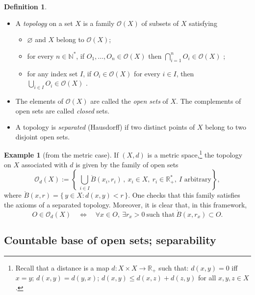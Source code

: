 \documentclass[11pt]{article}
\theoremstyle{definition}
\newtheorem{definition}{Definition}[section]
\newtheorem{example}{Example}[section]
\begin{document}
\begin{definition}
\begin{itemize}[leftmargin=1.5em]
\item[(a)] A \emph{topology} on a set $X$ is a family $\mathcal{O}(X)$ of subsets of $X$ satisfying
\begin{itemize}[leftmargin=1.2em]
\item[(i)] $\varnothing$ and $X$ belong to $\mathcal{O}(X)$;
\item[(ii)] for every $n\in\mathbb{N}^{\!*}$, if $O_1,\dots,O_n\in\mathcal{O}(X)$ then $\displaystyle \bigcap_{i=1}^n O_i\in\mathcal{O}(X)$ ;
\item[(iii)] for any index set $I$, if $O_i\in\mathcal{O}(X)$ for every $i\in I$, then $\displaystyle \bigcup_{i\in I} O_i\in\mathcal{O}(X)$ .
\end{itemize}
\item[(b)] The elements of $\mathcal{O}(X)$ are called the \emph{open sets} of $X$.
The complements of open sets are called \emph{closed} sets.
\item[(c)] A topology is \emph{separated} (Hausdorff) if two distinct points of $X$ belong to two disjoint open sets.
\end{itemize}
\end{definition}

\begin{example}[from the metric case]
If $(X,d)$ is a metric space,\footnote{Recall that a distance is a map $d:X\times X\to\mathbb{R}_+$ such that:
$d(x,y)=0$ iff $x=y$; $d(x,y)=d(y,x)$; $d(x,y)\le d(x,z)+d(z,y)$ for all $x,y,z\in X$.}
the topology on $X$ associated with $d$ is given by the family of open sets
\[
\mathcal{O}_d(X):=\left\{\ \bigcup_{i\in I} \mathring{B}(x_i,r_i)\,,\ x_i\in X,\ r_i\in\mathbb{R}_+^{\!*},\ I\text{ arbitrary}\right\},
\]
where $\mathring{B}(x,r)=\{\,y\in X: d(x,y)<r\,\}$.
One checks that this family satisfies the axioms of a separated topology.
Moreover, it is clear that, in this framework,
\[
O\in\mathcal{O}_d(X)\quad\Longleftrightarrow\quad
\forall x\in O,\ \exists r_x>0\ \text{such that}\ \mathring{B}(x,r_x)\subset O .
\]

\end{example}

\subsection{Countable base of open sets; separability}
\end{document}
